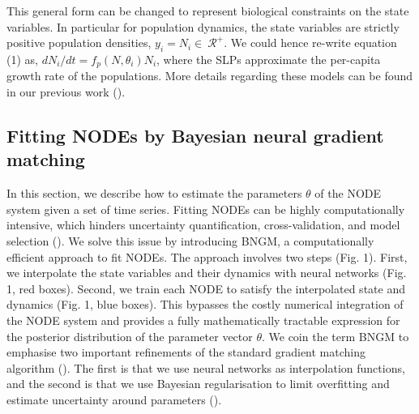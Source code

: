 \documentclass[11pt, oneside]{article}
\begin{document}
This general form can be changed to represent biological constraints on the state variables.
In particular for population dynamics, the state variables are strictly positive population densities, $y_i = N_i \in~\mathcal{R^+}$.
We could hence re-write equation (1) as, $dN_i/dt = f_p(N,\theta_i)N_i$, where the SLPs approximate the per-capita growth rate of the populations.
More details regarding these models can be found in our previous work (\cite{Bonnaffe2021a}).

\subsection{Fitting NODEs by Bayesian neural gradient matching}

In this section, we describe how to estimate the parameters $\theta$ of the NODE system given a set of time series. 
Fitting NODEs can be highly computationally intensive, which hinders uncertainty quantification, cross-validation, and model selection (\cite{Bonnaffe2021a}).
We solve this issue by introducing BNGM, a computationally efficient approach to fit NODEs.
The approach involves two steps (Fig. 1).
First, we interpolate the state variables and their dynamics with neural networks (Fig. 1, red boxes).
Second, we train each NODE to satisfy the interpolated state and dynamics (Fig. 1, blue boxes).
This bypasses the costly numerical integration of the NODE system and provides a fully mathematically tractable expression for the posterior distribution of the parameter vector $\theta$. 
We coin the term BNGM to emphasise two important refinements of the standard gradient matching algorithm (\cite{Ellner2002}). 
The first is that we use neural networks as interpolation functions, and the second is that we use Bayesian regularisation to limit overfitting and estimate uncertainty around parameters (\cite{Cawley2007}).
\end{document}
